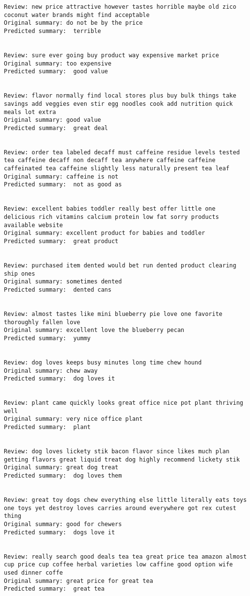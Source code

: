 \documentclass[11pt]{article}
\begin{document}
\begin{Verbatim}[commandchars=\\\{\}]
Review: new price attractive however tastes horrible maybe old zico coconut water brands might find acceptable 
Original summary: do not be by the price 
Predicted summary:  terrible


Review: sure ever going buy product way expensive market price 
Original summary: too expensive 
Predicted summary:  good value


Review: flavor normally find local stores plus buy bulk things take savings add veggies even stir egg noodles cook add nutrition quick meals lot extra 
Original summary: good value 
Predicted summary:  great deal


Review: order tea labeled decaff must caffeine residue levels tested tea caffeine decaff non decaff tea anywhere caffeine caffeine caffeinated tea caffeine slightly less naturally present tea leaf 
Original summary: caffeine is not 
Predicted summary:  not as good as


Review: excellent babies toddler really best offer little one delicious rich vitamins calcium protein low fat sorry products available website 
Original summary: excellent product for babies and toddler 
Predicted summary:  great product


Review: purchased item dented would bet run dented product clearing ship ones 
Original summary: sometimes dented 
Predicted summary:  dented cans


Review: almost tastes like mini blueberry pie love one favorite thoroughly fallen love 
Original summary: excellent love the blueberry pecan 
Predicted summary:  yummy


Review: dog loves keeps busy minutes long time chew hound 
Original summary: chew away 
Predicted summary:  dog loves it


Review: plant came quickly looks great office nice pot plant thriving well 
Original summary: very nice office plant 
Predicted summary:  plant


Review: dog loves lickety stik bacon flavor since likes much plan getting flavors great liquid treat dog highly recommend lickety stik 
Original summary: great dog treat 
Predicted summary:  dog loves them


Review: great toy dogs chew everything else little literally eats toys one toys yet destroy loves carries around everywhere got rex cutest thing 
Original summary: good for chewers 
Predicted summary:  dogs love it


Review: really search good deals tea tea great price tea amazon almost cup price cup coffee herbal varieties low caffine good option wife used dinner coffe 
Original summary: great price for great tea 
Predicted summary:  great tea



\end{Verbatim}
\end{document}
